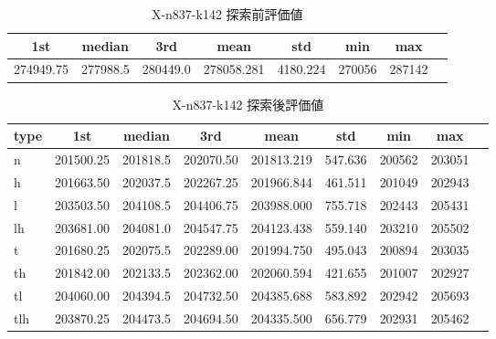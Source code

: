 \begin{table}[htbp]
    \caption{X-n837-k142 探索前評価値}
    \begin{tabular}{|l|l|l|l|l|l|l|l|}\hline
    \multicolumn{1}{|c|}{\textbf{1st}}
    &\multicolumn{1}{c|}{\textbf{median}}
    &\multicolumn{1}{c|}{\textbf{3rd}}
    &\multicolumn{1}{c|}{\textbf{mean}}
    &\multicolumn{1}{c|}{\textbf{std}}
    &\multicolumn{1}{c|}{\textbf{min}}
    &\multicolumn{1}{c|}{\textbf{max}}\\\hline
	274949.75 & 277988.5 & 280449.0 & 278058.281 & 4180.224 & 270056 & 287142\\\hline
	\end{tabular}
\end{table}
\begin{table}[htbp]
    \caption{X-n837-k142 探索後評価値}
    \begin{tabular}{|l|l|l|l|l|l|l|l|l|}\hline
    \multicolumn{1}{|c|}{\textbf{type}}
    &\multicolumn{1}{|c|}{\textbf{1st}}
    &\multicolumn{1}{c|}{\textbf{median}}
    &\multicolumn{1}{c|}{\textbf{3rd}}
    &\multicolumn{1}{c|}{\textbf{mean}}
    &\multicolumn{1}{c|}{\textbf{std}}
    &\multicolumn{1}{c|}{\textbf{min}}
    &\multicolumn{1}{c|}{\textbf{max}}\\\hline
	n & 201500.25 & 201818.5 & 202070.50 & 201813.219 & 547.636 & 200562 & 203051\\\hline
	h & 201663.50 & 202037.5 & 202267.25 & 201966.844 & 461.511 & 201049 & 202943\\\hline
	l & 203503.50 & 204108.5 & 204406.75 & 203988.000 & 755.718 & 202443 & 205431\\\hline
	lh & 203681.00 & 204081.0 & 204547.75 & 204123.438 & 559.140 & 203210 & 205502\\\hline
	t & 201680.25 & 202075.5 & 202289.00 & 201994.750 & 495.043 & 200894 & 203035\\\hline
	th & 201842.00 & 202133.5 & 202362.00 & 202060.594 & 421.655 & 201007 & 202927\\\hline
	tl & 204060.00 & 204394.5 & 204732.50 & 204385.688 & 583.892 & 202942 & 205693\\\hline
	tlh & 203870.25 & 204473.5 & 204694.50 & 204335.500 & 656.779 & 202931 & 205462\\\hline
	\end{tabular}
\end{table}
